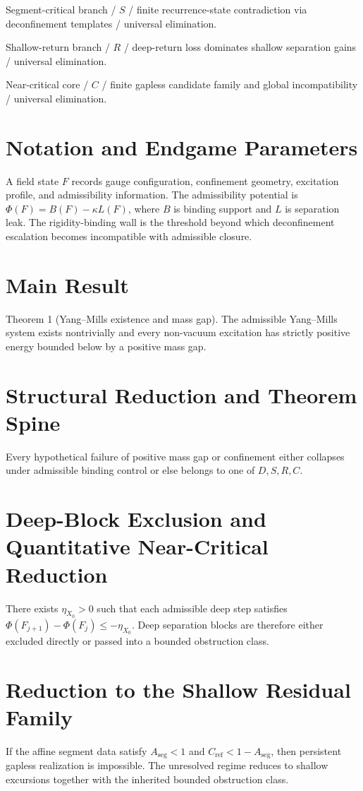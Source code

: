 \documentclass[11pt]{article}
\theoremstyle{definition}
\begin{document}
Segment-critical branch / $S$ / finite recurrence-state contradiction via deconfinement templates / universal elimination.

Shallow-return branch / $R$ / deep-return loss dominates shallow separation gains / universal elimination.

Near-critical core / $C$ / finite gapless candidate family and global incompatibility / universal elimination.
\section{Notation and Endgame Parameters}
A field state $F$ records gauge configuration, confinement geometry, excitation profile, and admissibility information. The admissibility potential is $\Phi(F)=B(F)-\kappa L(F)$, where $B$ is binding support and $L$ is separation leak. The rigidity-binding wall is the threshold beyond which deconfinement escalation becomes incompatible with admissible closure.
\section{Main Result}
Theorem 1 (Yang--Mills existence and mass gap). The admissible Yang--Mills system exists nontrivially and every non-vacuum excitation has strictly positive energy bounded below by a positive mass gap.
\section{Structural Reduction and Theorem Spine}
Every hypothetical failure of positive mass gap or confinement either collapses under admissible binding control or else belongs to one of $D,S,R,C$.
\section{Deep-Block Exclusion and Quantitative Near-Critical Reduction}
There exists $\eta_{X_0}>0$ such that each admissible deep step satisfies $\Phi(F_{j+1})-\Phi(F_j)\le -\eta_{X_0}$. Deep separation blocks are therefore either excluded directly or passed into a bounded obstruction class.
\section{Reduction to the Shallow Residual Family}
If the affine segment data satisfy $A_{\mathrm{seg}}<1$ and $C_{\mathrm{ref}}<1-A_{\mathrm{seg}}$, then persistent gapless realization is impossible. The unresolved regime reduces to shallow excursions together with the inherited bounded obstruction class.
\end{document}
